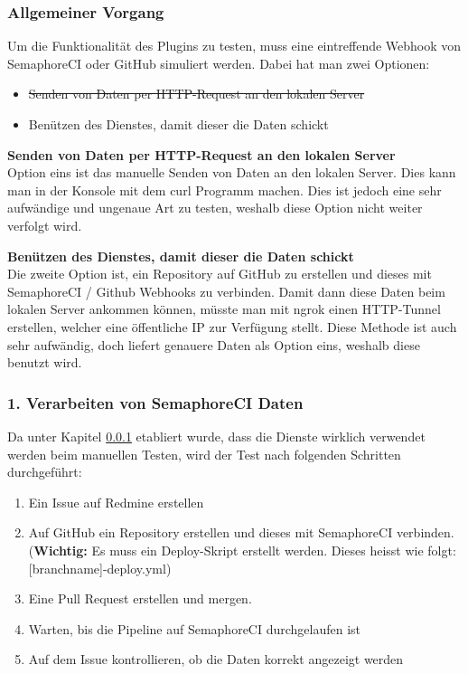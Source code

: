 \subsubsection{Allgemeiner Vorgang}
\label{sec:general-testing}
Um die Funktionalität des Plugins zu testen, muss eine eintreffende Webhook von SemaphoreCI oder GitHub simuliert werden.
Dabei hat man zwei Optionen:
\begin{itemize}
  \item \st{Senden von Daten per HTTP-Request an den lokalen Server}
  \item Benützen des Dienstes, damit dieser die Daten schickt
\end{itemize}

\textbf{Senden von Daten per HTTP-Request an den lokalen Server} \\
Option eins ist das manuelle Senden von Daten an den lokalen Server. Dies kann man in der Konsole mit dem curl Programm
\cite{everything_curl} machen. Dies ist jedoch eine sehr aufwändige und ungenaue Art zu testen, weshalb diese Option nicht
weiter verfolgt wird. \newline

\textbf{Benützen des Dienstes, damit dieser die Daten schickt} \\
Die zweite Option ist, ein Repository auf GitHub zu erstellen und dieses mit SemaphoreCI / Github Webhooks zu
verbinden. \newline
Damit dann diese Daten beim lokalen Server ankommen können, müsste man mit ngrok \cite{ngrok_http_docs} einen HTTP-Tunnel
erstellen, welcher eine öffentliche IP zur Verfügung stellt. \newline
Diese Methode ist auch sehr aufwändig, doch liefert genauere Daten als Option eins, weshalb diese benutzt wird.

\subsubsection{1. Verarbeiten von SemaphoreCI Daten}
Da unter Kapitel \ref{sec:general-testing} etabliert wurde, dass die Dienste wirklich verwendet werden beim manuellen Testen,
wird der Test nach folgenden Schritten durchgeführt:
\begin{enumerate}
  \item Ein Issue auf Redmine erstellen
  \item Auf GitHub ein Repository erstellen und dieses mit SemaphoreCI verbinden. 
  (\textbf{Wichtig:} Es muss ein Deploy-Skript erstellt werden. Dieses heisst wie folgt:
  [branchname]-deploy.yml)
  \item Eine Pull Request erstellen und mergen.
  \item Warten, bis die Pipeline auf SemaphoreCI durchgelaufen ist
  \item Auf dem Issue kontrollieren, ob die Daten korrekt angezeigt werden
\end{enumerate}

